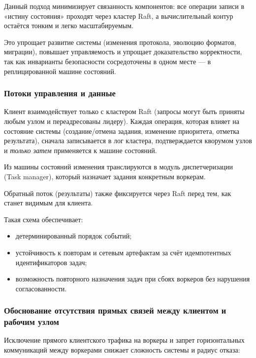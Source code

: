 Данный подход минимизирует связанность компонентов: все операции записи в
«истину состояния» проходят через кластер Raft, а вычислительный контур
остаётся тонким и легко масштабируемым.

Это упрощает развитие системы (изменения протокола, эволюцию форматов,
миграции), повышает управляемость и упрощает доказательство корректности, так
как инварианты безопасности сосредоточены в одном месте — в реплицированной
машине состояний.

\subsubsection{Потоки управления и данные}

Клиент взаимодействует только с кластером Raft (запросы могут быть приняты
любым узлом и переадресованы лидеру). Каждая операция, которая влияет на
состояние системы (создание/отмена задания, изменение приоритета, отметка
результата), сначала записывается в лог кластера, подтверждается кворумом узлов
и \emph{только затем} применяется к машине состояний.

Из машины состояний изменения транслируются в модуль диспетчеризации (Task
manager), который назначает задания конкретным воркерам.

Обратный поток (результаты) также фиксируется через Raft перед тем, как станет
видимым для клиента.

Такая схема обеспечивает:
\begin{itemize}
    \item детерминированный порядок событий;
    \item устойчивость к повторам и сетевым артефактам за счёт идемпотентных
    идентификаторов задач;
    \item возможность повторного назначения задач при сбоях воркеров без
    нарушения согласованности.
\end{itemize}

\subsubsection{Обоснование отсутствия прямых связей между клиентом и рабочим узлом}

Исключение прямого клиентского трафика на воркеры и запрет горизонтальных
коммуникаций между воркерами снижает сложность системы и радиус отказа:

